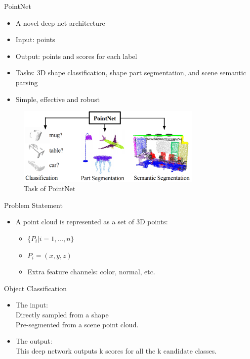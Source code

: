 \documentclass[serif,mathserif]{beamer}
\begin{document}
\begin{frame}{PointNet}
	\begin{itemize}
		\item A novel deep net architecture
		\item Input: points
		\item Output: points and scores for each label
		\item Tasks: 3D shape classification, shape part segmentation, and scene semantic parsing 
		\item Simple, effective and robust
	\end{itemize}
	\begin{figure}
		\includegraphics[width=9cm]{image/teaser.png}
		\caption{Task of PointNet}
	\end{figure}
\end{frame}

\begin{frame}{Problem Statement}
	\begin{itemize}
		\item A point cloud is represented as a set of 3D points:  
		\begin{itemize}
			\item $ \{P_i | i = 1,...,n\} $
			\item $ P_i = (x, y, z) $
			\item Extra feature channels: color, normal, etc.
		\end{itemize}
	\end{itemize}
\end{frame}

\begin{frame}{Object Classification}
	\begin{itemize}
		\item The input: \\
		Directly sampled from a shape \\
		Pre-segmented from a scene point cloud. 
		\item The output: \\
		This deep network outputs k scores for all the k candidate classes.
	\end{itemize}
\end{frame}
\end{document}
